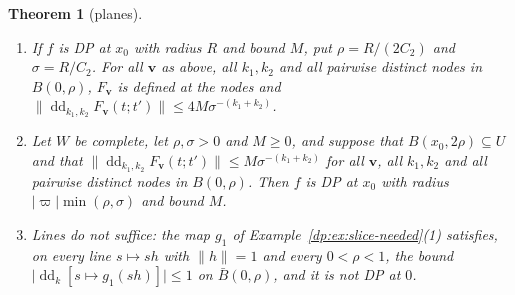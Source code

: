 \documentclass[11pt]{amsart}
\newtheorem{theorem}{Theorem}[section]
\theoremstyle{definition}
\theoremstyle{remark}
\numberwithin{equation}{section}
\newcommand{\abs}[1]{\lvert #1\rvert}
\newcommand{\norm}[1]{\lVert #1\rVert}
\theoremstyle{plain}
\theoremstyle{definition}
\theoremstyle{plain}
\begin{document}
\begin{theorem}[planes]\label{dp:thm:divided-planes}
\leavevmode
\begin{enumerate}
\item If $f$ is DP at $x_0$ with radius $R$ and bound $M$, put $\rho=R/(2C_2)$ and $\sigma=R/C_2$. For all $\mathbf v$ as above, all $k_1,k_2$ and all pairwise distinct nodes in $B(0,\rho)$, $F_{\mathbf v}$ is defined at the nodes and $\norm{\operatorname{dd}_{k_1,k_2}F_{\mathbf v}(t;t')}\le4M\sigma^{-(k_1+k_2)}$.
\item Let $W$ be complete, let $\rho,\sigma>0$ and $M\ge0$, and suppose that $B(x_0,2\rho)\subseteq U$ and that $\norm{\operatorname{dd}_{k_1,k_2}F_{\mathbf v}(t;t')}\le M\sigma^{-(k_1+k_2)}$ for all $\mathbf v$, all $k_1,k_2$ and all pairwise distinct nodes in $B(0,\rho)$. Then $f$ is DP at $x_0$ with radius $\abs\varpi\min(\rho,\sigma)$ and bound $M$.
\item Lines do not suffice: the map $g_1$ of Example~\textup{\ref{dp:ex:slice-needed}(1)} satisfies, on every line $s\mapsto sh$ with $\norm h=1$ and every $0<\rho<1$, the bound $\abs{\operatorname{dd}_k[s\mapsto g_1(sh)]}\le1$ on $\bar B(0,\rho)$, and it is not DP at $0$.
\end{enumerate}
\end{theorem}
\end{document}
